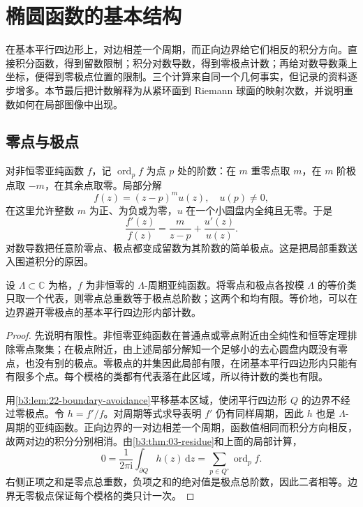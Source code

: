 \section{椭圆函数的基本结构}
\label{b3:sec:2202}

在基本平行四边形上，对边相差一个周期，而正向边界给它们相反的积分方向。直接积分函数，得到留数限制；积分对数导数，得到零极点计数；再给对数导数乘上坐标，便得到零极点位置的限制。三个计算来自同一个几何事实，但记录的资料逐步增多。本节最后把计数解释为从紧环面到 Riemann 球面的映射次数，并说明重数如何在局部图像中出现。

\subsection{零点与极点}
\label{b3:subsec:220201}

对非恒零亚纯函数 \(f\)，记 \(\operatorname{ord}_p f\) 为点 \(p\) 处的阶数：在 \(m\) 重零点取 \(m\)，在 \(m\) 阶极点取 \(-m\)，在其余点取零。局部分解
\[
 f(z)=(z-p)^m u(z),\quad u(p)\ne0,
\]
在这里允许整数 \(m\) 为正、为负或为零，\(u\) 在一个小圆盘内全纯且无零。于是
\[
 \frac{f'(z)}{f(z)}=\frac{m}{z-p}+\frac{u'(z)}{u(z)}.
\]
对数导数把任意阶零点、极点都变成留数为其阶数的简单极点。这是把局部重数送入围道积分的原因。

\begin{proposition}\label{b3:prop:22-zero-pole-count}
设 \(\Lambda\subset\mathbb C\) 为格，\(f\) 为非恒零的 \(\Lambda\)-周期亚纯函数。将零点和极点各按模 \(\Lambda\) 的等价类只取一个代表，则零点总重数等于极点总阶数；这两个和均有限。等价地，可以在边界避开零极点的基本平行四边形内部计数。
\end{proposition}
\begin{proof}
先说明有限性。非恒零亚纯函数在普通点或零点附近由全纯性和恒等定理排除零点聚集；在极点附近，由上述局部分解知一个足够小的去心圆盘内既没有零点，也没有别的极点。零极点的并集因此局部有限，在闭基本平行四边形内只能有有限多个点。每个模格的类都有代表落在此区域，所以待计数的类也有限。

用\cref{b3:lem:22-boundary-avoidance}平移基本区域，使闭平行四边形 \(Q\) 的边界不经过零极点。令 \(h=f'/f\)。对周期等式求导表明 \(f'\) 仍有同样周期，因此 \(h\) 也是 \(\Lambda\)-周期的亚纯函数。正向边界的一对边相差一个周期，函数值相同而积分方向相反，故两对边的积分分别相消。由\cref{b3:thm:03-residue}和上面的局部计算，
\[
 0=\frac1{2\pi\mathrm{i}}\int_{\partial Q}h(z)\,\mathrm{d}z
 =\sum_{p\in Q^\circ}\operatorname{ord}_p f.
\]
右侧正项之和是零点总重数，负项之和的绝对值是极点总阶数，因此二者相等。边界无零极点保证每个模格的类只计一次。
\end{proof}

